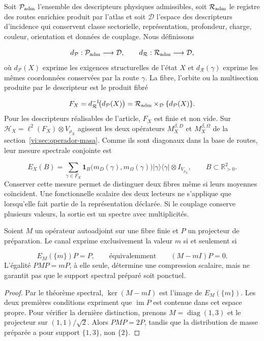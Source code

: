 Soit \(\mathcal P_{\rm adm}\) l’ensemble des descripteurs physiques admissibles,
soit \(\mathcal R_{\rm adm}\) le registre des routes enrichies produit par
l’atlas et soit \(\mathcal D\) l’espace des descripteurs d’incidence qui
conservent classe sectorielle, représentation, profondeur, charge, couleur,
orientation et données de couplage. Nous définissons

\[
 d_{\mathcal P}:\mathcal P_{\rm adm}\longrightarrow\mathcal D,
 \qquad
 d_{\mathcal R}:\mathcal R_{\rm adm}\longrightarrow\mathcal D,
\]
où \(d_{\mathcal P}(X)\) exprime les exigences structurelles de l’état
\(X\) et \(d_{\mathcal R}(\gamma)\) exprime les mêmes coordonnées conservées
par la route \(\gamma\). La fibre, l’orbite ou la multisection produite par le
descripteur est le produit fibré

\begin{equation}
 F_X=d_{\mathcal R}^{-1}\!\bigl(d_{\mathcal P}(X)\bigr)
 =\mathcal R_{\rm adm}\times_{\mathcal D}\{d_{\mathcal P}(X)\}.
 \label{vi:eq:fibra-descriptor}
\end{equation}
Pour les descripteurs réalisables de l’article, \(F_X\) est finie et non vide.
Sur
\(\mathcal H_X=\ell^2(F_X)\otimes V_{\rho_X}\) agissent les deux opérateurs
\(M_X^{\beta,D}\) et \(M_X^{\beta,\Omega}\) de la
section~\ref{vi:sec:operador-masa}. Comme ils sont diagonaux dans la base de
routes, leur mesure spectrale conjointe est

\begin{equation}
 E_X(B)=\sum_{\gamma\in F_X}
 \mathbf1_B\bigl(m_D(\gamma),m_\Omega(\gamma)\bigr)
 |\gamma\rangle\langle\gamma|\otimes I_{V_{\rho_X}},
 \qquad B\subset\mathbb R_{>0}^2.
 \label{vi:eq:familias-pvm}
\end{equation}
Conserver cette mesure permet de distinguer deux fibres même si leurs moyennes
coïncident. Une fonctionnelle scalaire des deux lecteurs ne s’applique que
lorsqu’elle fait partie de la représentation déclarée. Si le couplage
conserve plusieurs valeurs, la sortie est un spectre avec multiplicités.


\begin{proposition}
\label{vi:prop:familias-linea}
Soient \(M\) un opérateur autoadjoint sur une fibre finie et \(P\) un
projecteur de préparation. Le canal exprime exclusivement la valeur \(m\)
si et seulement si

\[
 E_M(\{m\})P=P,
 \qquad\text{équivalemment}\qquad (M-mI)P=0.
\]
L’égalité \(PMP=mP\), à elle seule, détermine une compression scalaire,
mais ne garantit pas que le support spectral préparé soit ponctuel.

\end{proposition}
\begin{proof}
Par le théorème spectral, \(\ker(M-mI)\) est l’image de
\(E_M(\{m\})\). Les deux premières conditions expriment que
\(\operatorname{im}P\) est contenue dans cet espace propre. Pour vérifier
la dernière distinction, prenons \(M=\operatorname{diag}(1,3)\) et le projecteur
sur \((1,1)/\sqrt2\). Alors \(PMP=2P\), tandis que la distribution
de masse préparée a pour support \(\{1,3\}\), non \(\{2\}\).

\end{proof}

